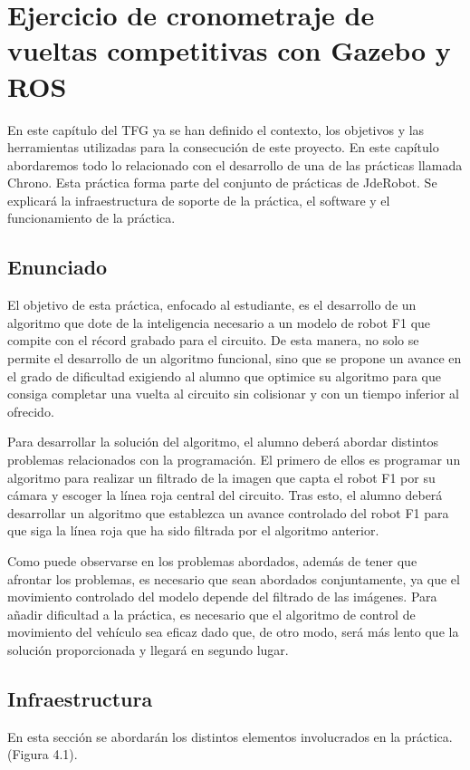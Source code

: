 \chapter{Ejercicio de cronometraje de vueltas competitivas con Gazebo y ROS}\label{cap.chrono}
En este capítulo del TFG ya se han definido el contexto, los objetivos y las herramientas utilizadas para la consecución de este proyecto. En este capítulo abordaremos todo lo relacionado con el desarrollo de una de las prácticas llamada Chrono. Esta práctica forma parte del conjunto de prácticas de JdeRobot. Se explicará la infraestructura de soporte de la práctica, el software y el funcionamiento de la práctica.

\section{Enunciado}\label{sec.enunciado}
El objetivo de esta práctica, enfocado al estudiante, es el desarrollo de un algoritmo que dote de la inteligencia necesario a un modelo de robot F1 que compite con el récord grabado para el circuito. De esta manera, no solo se permite el desarrollo de un algoritmo funcional, sino que se propone un avance en el grado de dificultad exigiendo al alumno que optimice su algoritmo para que consiga completar una vuelta al circuito sin colisionar y con un tiempo inferior al ofrecido.

Para desarrollar la solución del algoritmo, el alumno deberá abordar distintos problemas relacionados con la programación. El primero de ellos es programar un algoritmo para realizar un filtrado de la imagen que capta el robot F1 por su cámara y escoger la línea roja central del circuito. Tras esto, el alumno deberá desarrollar un algoritmo que establezca un avance controlado del robot F1 para que siga la línea roja que ha sido filtrada por el algoritmo anterior.

Como puede observarse en los problemas abordados, además de tener que afrontar los problemas, es necesario que sean abordados conjuntamente, ya que el movimiento controlado del modelo depende del filtrado de las imágenes. Para añadir dificultad a la práctica, es necesario que el algoritmo de control de movimiento del vehículo sea eficaz dado que, de otro modo, será más lento que la solución proporcionada y llegará en segundo lugar.

\section{Infraestructura}
En esta sección se abordarán los distintos elementos involucrados en la práctica. (Figura 4.1).


